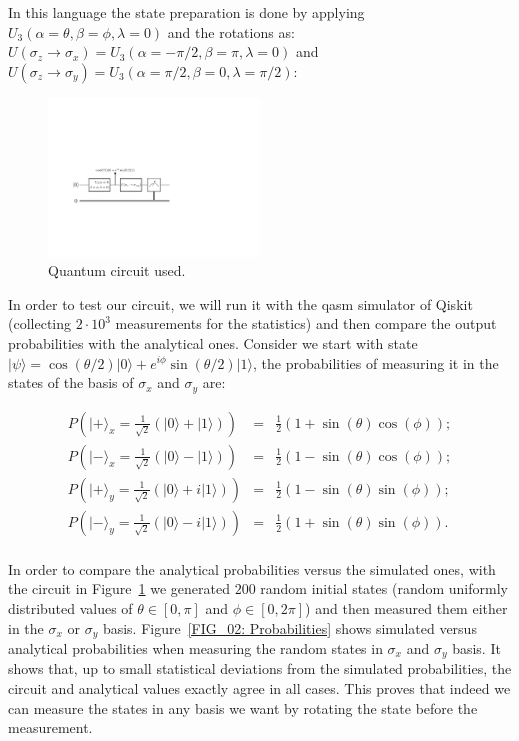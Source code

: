 \documentclass[12pt]{article}
\begin{document}
\begin{appendices}
In this language the state preparation is done by applying $U_3(\alpha = \theta, \beta = \phi, \lambda = 0)$ and the rotations as: $ U(\sigma_z \to \sigma_x) =U_3(\alpha = -\pi/2, \beta = \pi, \lambda = 0)$ and $ U(\sigma_z \to \sigma_y) =U_3(\alpha = \pi/2, \beta = 0, \lambda = \pi/2)$: 

    \begin{figure}[h]
        \includegraphics[width=0.5\textwidth]{Scheme.pdf}
       \caption{\label{FIG_01: Scheme} Quantum circuit used.} 
    \end{figure} 
    
In order to test our circuit, we will run it with the qasm simulator of Qiskit (collecting $2\cdot 10^3$ measurements for the statistics) and then compare the output probabilities with the analytical ones. Consider we start with state $|\psi \rangle = \cos(\theta /2)|0\rangle + e^{i\phi}\sin(\theta /2)|1\rangle$, the probabilities of measuring it in the states of the basis of $\sigma_x$ and $\sigma_y$ are: 

$$
\begin{aligned}
    P\left(|+\rangle_x = \frac{1}{\sqrt{2}}(|0\rangle +|1\rangle)\right) &=& \frac{1}{2}\left(1+\sin(\theta)\cos(\phi) \right);\\
    P\left(|-\rangle_x = \frac{1}{\sqrt{2}}(|0\rangle -|1\rangle)\right) &=& \frac{1}{2}\left(1-\sin(\theta)\cos(\phi) \right);\\
    P\left(|+\rangle_y = \frac{1}{\sqrt{2}}(|0\rangle +i|1\rangle)\right) &=& \frac{1}{2}\left(1-\sin(\theta)\sin(\phi) \right);\\
    P\left(|-\rangle_y = \frac{1}{\sqrt{2}}(|0\rangle -i|1\rangle)\right) &=& \frac{1}{2}\left(1+\sin(\theta)\sin(\phi) \right).\\
\end{aligned}
$$

In order to compare the analytical probabilities versus the simulated ones, with the circuit in Figure~\ref{FIG_01: Scheme} we generated $200$ random initial states (random uniformly distributed values of $\theta\in[0,\pi]$ and $\phi\in[0,2\pi]$) and then measured them either in the $\sigma_x$ or $\sigma_y$ basis. Figure~\ref{FIG_02: Probabilities} shows simulated versus analytical probabilities when measuring the random states in $\sigma_x$ and $\sigma_y$ basis. It shows that, up to small statistical deviations from the simulated probabilities, the circuit and analytical values exactly agree in all cases. This proves that indeed we can measure the states in any basis we want by rotating the state before the measurement.


\end{appendices}
\end{document}
